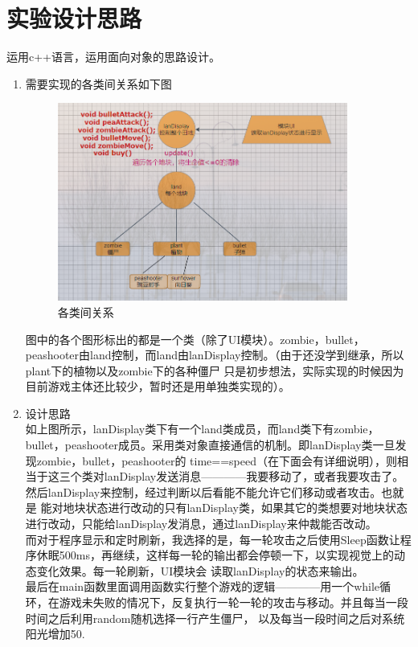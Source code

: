 \documentclass[12pt,a4paper,UTF8]{article}
\begin{document}
\section{实验设计思路}
    运用c++语言，运用面向对象的思路设计。
    \begin{enumerate}
      \item 需要实现的各类间关系如下图
          \begin{figure}[H]
            \centering
          \includegraphics[width=0.9\textwidth]{figure/UMI.png}
          \caption{各类间关系}
          \end{figure}
        图中的各个图形标出的都是一个类（除了UI模块）。zombie，bullet，peashooter由land控制，而land由lanDisplay控制。（由于还没学到继承，所以plant下的植物以及zombie下的各种僵尸
        只是初步想法，实际实现的时候因为目前游戏主体还比较少，暂时还是用单独类实现的）。
    \item 设计思路\\
        如上图所示，lanDisplay类下有一个land类成员，而land类下有zombie，bullet，peashooter成员。采用类对象直接通信的机制。即lanDisplay类一旦发现zombie，bullet，peashooter的
        time==speed（在下面会有详细说明），则相当于这三个类对lanDisplay发送消息————我要移动了，或者我要攻击了。然后lanDisplay来控制，经过判断以后看能不能允许它们移动或者攻击。也就是
        能对地块状态进行改动的只有lanDisplay类，如果其它的类想要对地块状态进行改动，只能给lanDisplay发消息，通过lanDisplay来仲裁能否改动。\\
        而对于程序显示和定时刷新，我选择的是，每一轮攻击之后使用Sleep函数让程序休眠500ms，再继续，这样每一轮的输出都会停顿一下，以实现视觉上的动态变化效果。每一轮刷新，UI模块会
        读取lanDisplay的状态来输出。\\
        最后在main函数里面调用函数实行整个游戏的逻辑————用一个while循环，在游戏未失败的情况下，反复执行一轮一轮的攻击与移动。并且每当一段时间之后利用random随机选择一行产生僵尸，
        以及每当一段时间之后对系统阳光增加50.
    \end{enumerate}
\end{document}
